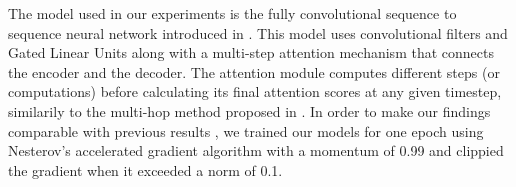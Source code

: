 The model used in our experiments is the fully convolutional sequence to sequence neural network introduced in \cite{gehring:etal:2017}.
This model uses convolutional filters and Gated Linear Units \cite{dauphin:etal:2016} along with a multi-step attention mechanism that connects the encoder and the decoder.
The attention module computes different steps (or computations) before calculating its final attention scores at any given timestep, similarily 
to the multi-hop method proposed in \cite{sukhbaatar:etal:2015}.
In order to make our findings comparable with previous results \cite{Lake:Baroni:2017,Loula:etal:2018}, 
we trained our models for one epoch using Nesterov’s accelerated gradient algorithm \cite{sutskever:etal:2013} with a momentum of 0.99 \cite{pascanu:etal:2012} 
and clippied the gradient when it exceeded a norm of 0.1. 




